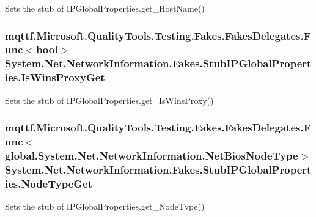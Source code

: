 Sets the stub of I\-P\-Global\-Properties.\-get\-\_\-\-Host\-Name()

\hypertarget{class_system_1_1_net_1_1_network_information_1_1_fakes_1_1_stub_i_p_global_properties_a0eba0b7245ae2c7998b10b4e5c47497f}{
\subsubsection[{Is\-Wins\-Proxy\-Get}]{\setlength{\rightskip}{0pt plus 5cm}mqttf.\-Microsoft.\-Quality\-Tools.\-Testing.\-Fakes.\-Fakes\-Delegates.\-Func$<$bool$>$ System.\-Net.\-Network\-Information.\-Fakes.\-Stub\-I\-P\-Global\-Properties.\-Is\-Wins\-Proxy\-Get}}\label{class_system_1_1_net_1_1_network_information_1_1_fakes_1_1_stub_i_p_global_properties_a0eba0b7245ae2c7998b10b4e5c47497f}


Sets the stub of I\-P\-Global\-Properties.\-get\-\_\-\-Is\-Wins\-Proxy()

\hypertarget{class_system_1_1_net_1_1_network_information_1_1_fakes_1_1_stub_i_p_global_properties_a72425b7e57b3861a125db3891f961614}{
\subsubsection[{Node\-Type\-Get}]{\setlength{\rightskip}{0pt plus 5cm}mqttf.\-Microsoft.\-Quality\-Tools.\-Testing.\-Fakes.\-Fakes\-Delegates.\-Func$<$global.\-System.\-Net.\-Network\-Information.\-Net\-Bios\-Node\-Type$>$ System.\-Net.\-Network\-Information.\-Fakes.\-Stub\-I\-P\-Global\-Properties.\-Node\-Type\-Get}}\label{class_system_1_1_net_1_1_network_information_1_1_fakes_1_1_stub_i_p_global_properties_a72425b7e57b3861a125db3891f961614}


Sets the stub of I\-P\-Global\-Properties.\-get\-\_\-\-Node\-Type()



